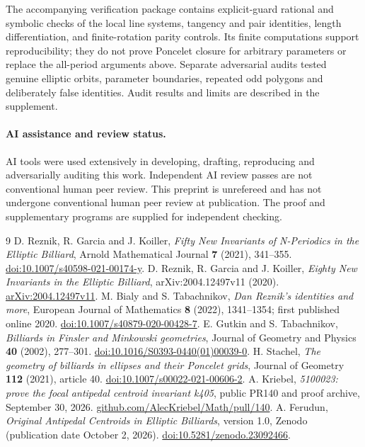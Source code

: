 \documentclass[11pt]{article}
\begin{document}
The accompanying verification package contains explicit-guard rational
and symbolic checks of the local line systems, tangency and pair
identities, length differentiation, and finite-rotation parity controls.
Its finite computations support reproducibility; they do not prove
Poncelet closure for arbitrary parameters or replace the all-period
arguments above. Separate adversarial audits tested genuine elliptic
orbits, parameter boundaries, repeated odd polygons and deliberately
false identities. Audit results and limits are described in the
supplement.

\paragraph{AI assistance and review status.}
AI tools were used extensively in developing, drafting, reproducing
and adversarially auditing this work. Independent AI review passes
are not conventional human peer review. This preprint is unrefereed
and has not undergone conventional human peer review at publication.
The proof and supplementary programs are supplied for independent
checking.

\begin{thebibliography}{9}
 D. Reznik, R. Garcia and J. Koiller,
\emph{Fifty New Invariants of N-Periodics in the Elliptic Billiard},
Arnold Mathematical Journal \textbf{7} (2021), 341--355.
\href{https://doi.org/10.1007/s40598-021-00174-y}{doi:10.1007/s40598-021-00174-y}.
 D. Reznik, R. Garcia and J. Koiller,
\emph{Eighty New Invariants in the Elliptic Billiard},
arXiv:2004.12497v11 (2020).
\href{https://arxiv.org/abs/2004.12497v11}{arXiv:2004.12497v11}.
 M. Bialy and S. Tabachnikov,
\emph{Dan Reznik's identities and more}, European Journal of
Mathematics \textbf{8} (2022), 1341--1354; first published online 2020.
\href{https://doi.org/10.1007/s40879-020-00428-7}{doi:10.1007/s40879-020-00428-7}.
 E. Gutkin and S. Tabachnikov,
\emph{Billiards in Finsler and Minkowski geometries}, Journal of
Geometry and Physics \textbf{40} (2002), 277--301.
\href{https://doi.org/10.1016/S0393-0440(01)00039-0}{doi:10.1016/S0393-0440(01)00039-0}.
 H. Stachel,
\emph{The geometry of billiards in ellipses and their Poncelet grids},
Journal of Geometry \textbf{112} (2021), article 40.
\href{https://doi.org/10.1007/s00022-021-00606-2}{doi:10.1007/s00022-021-00606-2}.
 A. Kriebel, \emph{5100023: prove the focal antipedal
centroid invariant k405}, public PR140 and proof archive, September 30, 2026.
\href{https://github.com/AlecKriebel/Math/pull/140}{github.com/AlecKriebel/Math/pull/140}.
 A. Ferudun,
\emph{Original Antipedal Centroids in Elliptic Billiards}, version 1.0,
Zenodo (publication date October 2, 2026).
\href{https://doi.org/10.5281/zenodo.23092466}{doi:10.5281/zenodo.23092466}.
\end{thebibliography}
\end{document}

